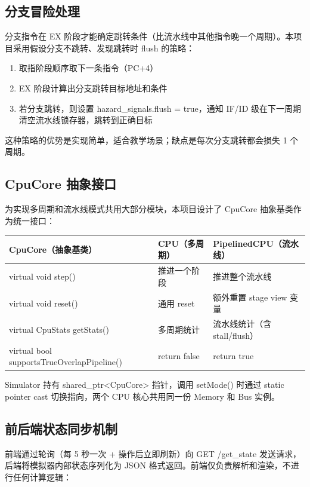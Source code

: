 \documentclass[12pt, a4paper]{article}
\begin{document}
\subsection{分支冒险处理}\label{sec:branch-hazard}

分支指令在 EX 阶段才能确定跳转条件（比流水线中其他指令晚一个周期）。本项目采用假设分支不跳转、发现跳转时 flush 的策略：

\begin{enumerate}
\item 取指阶段顺序取下一条指令（PC+4）
\item EX 阶段计算出分支跳转目标地址和条件
\item 若分支跳转，则设置 hazard\_signals.flush = true，通知 IF/ID 级在下一周期清空流水线锁存器，跳转到正确目标
\end{enumerate}

这种策略的优势是实现简单，适合教学场景；缺点是每次分支跳转都会损失 1 个周期。

\subsection{CpuCore 抽象接口}\label{sec:cpu-core}

为实现多周期和流水线模式共用大部分模块，本项目设计了 CpuCore 抽象基类作为统一接口：

\begin{tabular}{|l|l|l|}
\hline
CpuCore（抽象基类） & CPU（多周期） & PipelinedCPU（流水线） \\[0.8ex] \hline
virtual void step() & 推进一个阶段 & 推进整个流水线 \\[0.8ex] \hline
virtual void reset() & 通用 reset & 额外重置 stage view 变量 \\[0.8ex] \hline
virtual CpuStats getStats() & 多周期统计 & 流水线统计（含 stall/flush） \\[0.8ex] \hline
virtual bool supportsTrueOverlapPipeline() & return false & return true \\ \hline
\end{tabular}

Simulator 持有 shared\_ptr<CpuCore> 指针，调用 setMode() 时通过 static pointer cast 切换指向，两个 CPU 核心共用同一份 Memory 和 Bus 实例。

\subsection{前后端状态同步机制}\label{sec:sync}

前端通过轮询（每 5 秒一次 + 操作后立即刷新）向 GET /get\_state 发送请求，后端将模拟器内部状态序列化为 JSON 格式返回。前端仅负责解析和渲染，不进行任何计算逻辑：
\end{document}
